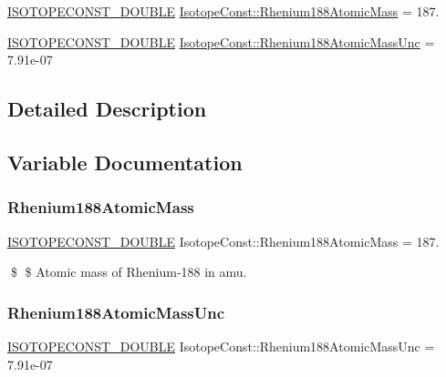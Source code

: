 \begin{DoxyCompactItemize}
\item 
\mbox{\hyperlink{group___isotope_const-_macros_ga8f45a7272ce02c0b4c65c44636ed719a}{I\+S\+O\+T\+O\+P\+E\+C\+O\+N\+S\+T\+\_\+\+D\+O\+U\+B\+LE}} \mbox{\hyperlink{group___isotope_const-_rhenium-_re188_ga63239fbe58df53253cfa33e3cc1b0636}{Isotope\+Const\+::\+Rhenium188\+Atomic\+Mass}} = 187.
\item 
\mbox{\hyperlink{group___isotope_const-_macros_ga8f45a7272ce02c0b4c65c44636ed719a}{I\+S\+O\+T\+O\+P\+E\+C\+O\+N\+S\+T\+\_\+\+D\+O\+U\+B\+LE}} \mbox{\hyperlink{group___isotope_const-_rhenium-_re188_ga7ecad345eb324383e3443b10d35ee15c}{Isotope\+Const\+::\+Rhenium188\+Atomic\+Mass\+Unc}} = 7.\+91e-\/07
\end{DoxyCompactItemize}


\subsection{Detailed Description}


\subsection{Variable Documentation}
\mbox{\label{group___isotope_const-_rhenium-_re188_ga63239fbe58df53253cfa33e3cc1b0636}} 
\subsubsection{\texorpdfstring{Rhenium188\+Atomic\+Mass}{Rhenium188AtomicMass}}
{\footnotesize\ttfamily \mbox{\hyperlink{group___isotope_const-_macros_ga8f45a7272ce02c0b4c65c44636ed719a}{I\+S\+O\+T\+O\+P\+E\+C\+O\+N\+S\+T\+\_\+\+D\+O\+U\+B\+LE}} Isotope\+Const\+::\+Rhenium188\+Atomic\+Mass = 187.}

\$ \$ Atomic mass of Rhenium-\/188 in amu. \mbox{\label{group___isotope_const-_rhenium-_re188_ga7ecad345eb324383e3443b10d35ee15c}} 
\subsubsection{\texorpdfstring{Rhenium188\+Atomic\+Mass\+Unc}{Rhenium188AtomicMassUnc}}
{\footnotesize\ttfamily \mbox{\hyperlink{group___isotope_const-_macros_ga8f45a7272ce02c0b4c65c44636ed719a}{I\+S\+O\+T\+O\+P\+E\+C\+O\+N\+S\+T\+\_\+\+D\+O\+U\+B\+LE}} Isotope\+Const\+::\+Rhenium188\+Atomic\+Mass\+Unc = 7.\+91e-\/07}

